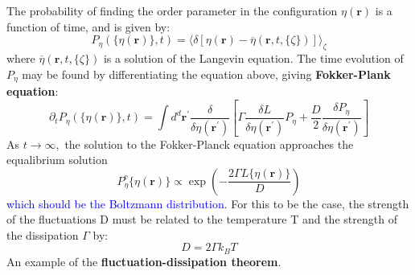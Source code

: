 \documentclass[12pt,titlepage]{article}
\newcommand{\bluep}[1]{\textcolor{blue}{#1}}
\numberwithin{equation}{section}
\begin{document}
The probability of finding the order parameter in the configuration $\eta(\mathbf{r})$ is a function of time, and is given by:
\begin{equation}
P_{\eta}(\{\eta(\mathbf{r})\}, t)=\langle\delta[\eta(\mathbf{r})-\overline{\eta}(\mathbf{r}, t,\{\zeta\})]\rangle_{\zeta}
\end{equation}
where $\overline{\eta}(\mathbf{r}, t,\{\zeta\})$ is a solution of the Langevin equation. The time evolution of $P_{\eta}$ may be found by differentiating the equation above, giving \textbf{Fokker-Plank equation}:
\begin{equation}
\partial_{t} P_{\eta}(\{\eta(\mathbf{r})\}, t)=\int d^{d} \mathbf{r}^{\prime} \frac{\delta}{\delta \eta\left(\mathbf{r}^{\prime}\right)}\left[\Gamma \frac{\delta L}{\delta \eta\left(\mathbf{r}^{\prime}\right)} P_{\eta}+\frac{D}{2} \frac{\delta P_{\eta}}{\delta \eta\left(\mathbf{r}^{\prime}\right)}\right]
\end{equation}
As $t \rightarrow \infty,$ the solution to the Fokker-Planck equation approaches the equalibrium solution
\begin{equation}
P_{\eta}^{\mathrm{e}}\{\eta(\mathbf{r})\} \propto \exp \left(-\frac{2 \Gamma L\{\eta(\mathbf{r})\}}{D}\right)
\end{equation}
\bluep{which should be the Boltzmann distribution}. For this to be the case, the strength of the fluctuations D must be related to the temperature T and the strength of the dissipation $\Gamma$ by:
\begin{equation}
D=2 \Gamma k_{B} T
\end{equation}
An example of the \textbf{fluctuation-dissipation theorem}.

\printindex
\end{document}
